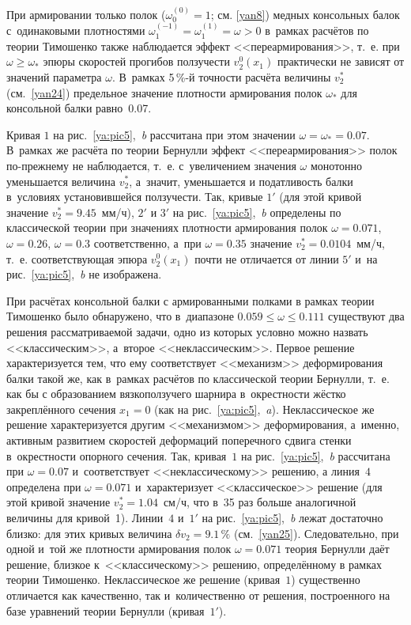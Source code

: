 При армировании только полок ($\omega_0^{(0)}=1$; 
см. \eqref{yan8}) 
медных консольных балок с~одинаковыми плотностями $\omega_1^{(-1)}=\omega_1^{(1)}=\omega>0$ 
в~рамках расчётов по теории Тимошенко также наблюдается эффект <<переармирования>>, 
т.~е. при $\omega\ge\omega_*$ эпюры скоростей прогибов ползучести $v_2^0(x_1)$ практически 
не зависят от значений параметра $\omega$. 
В~рамках 5\,\%-й точности расчёта величины $v_2^*$ (см.~\eqref{yan24}) предельное значение 
плотности армирования полок $\omega_*$ для консольной балки равно~0.07.

Кривая $1$ на рис.~\ref{ya:pic5},~{\sl b} рассчитана при этом значении $\omega=\omega_*=0.07$. 
В~рамках же расчёта по теории Бернулли эффект <<переармирования>> полок по-прежнему не наблюдается, 
т.~е. с~увеличением значения $\omega$ монотонно уменьшается величина $v_2^*$, 
а~значит, уменьшается и податливость балки в~условиях установившейся ползучести. 
Так, кривые $1'$ (для этой кривой значение $v_2^*=9.45$~мм/ч), 
$2'$ и $3'$ на рис.~\ref{ya:pic5},~{\sl b} определены по классической теории 
при значениях плотности армирования полок $\omega=0.071$, $\omega=0.26$, $\omega=0.3$ 
соответственно, а~при $\omega=0.35$ значение $v_2^*=0.0104$~мм/ч, 
т.~е. соответствующая эпюра $v_2^0(x_1)$ почти не отличается от линии $5'$ 
и~на рис.~\ref{ya:pic5},~{\sl b} не изображена.

При расчётах консольной балки с армированными полками в рамках теории Тимошенко было обнаружено, 
что в~диапазоне $0.059\le\omega\le0.111$ существуют два решения рассматриваемой задачи, 
одно из которых условно можно назвать <<классическим>>, а~второе <<неклассическим>>. 
Первое решение характеризуется тем, что ему соответствует <<механизм>> деформирования балки такой же, 
как в~рамках расчётов по классической теории Бернулли, т.~е. как бы с образованием вязкоползучего шарнира 
в~окрестности жёстко закреплённого сечения $x_1=0$ (как на рис.~\ref{ya:pic5},~{\sl a}). 
Неклассическое же решение характеризуется другим <<механизмом>> деформирования, 
а~именно, активным развитием скоростей деформаций поперечного сдвига стенки в~окрестности опорного сечения. 
Так, кривая~$1$ на рис.~\ref{ya:pic5},~{\sl b} рассчитана при $\omega = 0.07$ и~соответствует <<неклассическому>> 
решению, а линия~$4$ определена при $\omega=0.071$ и~характеризует <<классическое>> решение 
(для этой кривой значение $v_2^*=1.04$~см/ч, что в~35 раз больше аналогичной величины для кривой~1). 
Линии~$4$ и~$1'$ на рис.~\ref{ya:pic5},~{\sl b} лежат достаточно близко: 
для этих кривых величина $\delta v_2=9.1\,\%$ (см.~\eqref{yan25}). 
Следовательно, при одной и~той же плотности армирования полок $\omega=0.071$ теория Бернулли даёт решение, 
близкое к~<<классическому>> решению, определённому в рамках теории Тимошенко. 
Неклассическое же решение (кривая~$1$) существенно отличается как качественно, так и~количественно от решения, 
построенного на базе уравнений теории Бернулли (кривая~$1'$).

